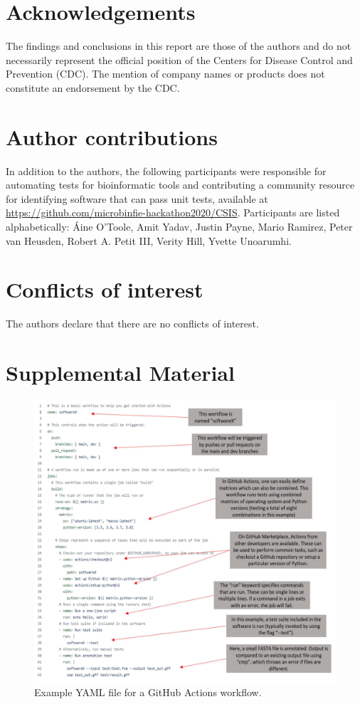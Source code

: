  
\section{Acknowledgements}
 
The findings and conclusions in this report are those of the authors and do not necessarily represent the official position of the Centers for Disease Control and Prevention (CDC). The mention of company names or products does not constitute an endorsement by the CDC.

 
\section{Author contributions}
 
In addition to the authors, the following participants were responsible for automating tests for bioinformatic tools and contributing a community resource for identifying software that can pass unit tests, available at \url{https://github.com/microbinfie-hackathon2020/CSIS}. Participants are listed alphabetically: Áine O’Toole, Amit Yadav, Justin Payne, Mario Ramirez, Peter van Heusden, Robert A. Petit III, Verity Hill, Yvette Unoarumhi.

 
\section{Conflicts of interest}
 
The authors declare that there are no conflicts of interest.

\section{Supplemental Material}

\begin{figure}[]
\centering
\includegraphics[width=\textwidth]{figures/chapter 8/sup_fig_1.png}
\caption{Example YAML file for a GitHub Actions workflow.}
\label{fig:chap8_sup_figure1}
\end{figure}



